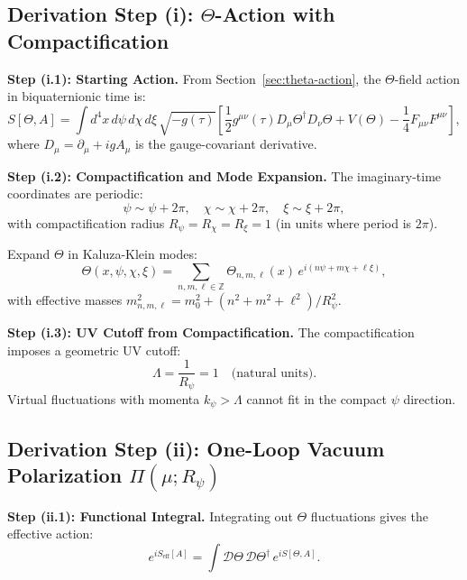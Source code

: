 \documentclass[11pt,a4paper]{article}
\theoremstyle{remark}
\begin{document}
\subsection{Derivation Step (i): $\Theta$-Action with Compactification}

\textbf{Step (i.1): Starting Action.} From Section~\ref{sec:theta-action}, the $\Theta$-field action in biquaternionic time is:
\begin{equation}
S[\Theta, A] = \int d^4x \, d\psi \, d\chi \, d\xi \, \sqrt{-g(\tau)} \left[ \frac{1}{2} g^{\mu\nu}(\tau) D_\mu \Theta^\dagger D_\nu \Theta + V(\Theta) - \frac{1}{4} F_{\mu\nu} F^{\mu\nu} \right],
\label{eq:action-step-i1}
\end{equation}
where $D_\mu = \partial_\mu + ig A_\mu$ is the gauge-covariant derivative.

\textbf{Step (i.2): Compactification and Mode Expansion.} The imaginary-time coordinates are periodic:
\begin{equation}
\psi \sim \psi + 2\pi, \quad \chi \sim \chi + 2\pi, \quad \xi \sim \xi + 2\pi,
\label{eq:periodicity-step}
\end{equation}
with compactification radius $R_\psi = R_\chi = R_\xi = 1$ (in units where period is $2\pi$).

Expand $\Theta$ in Kaluza-Klein modes:
\begin{equation}
\Theta(x, \psi, \chi, \xi) = \sum_{n,m,\ell \in \mathbb{Z}} \Theta_{n,m,\ell}(x) \, e^{i(n\psi + m\chi + \ell\xi)},
\label{eq:KK-expansion}
\end{equation}
with effective masses $m_{n,m,\ell}^2 = m_0^2 + (n^2 + m^2 + \ell^2)/R_\psi^2$.

\textbf{Step (i.3): UV Cutoff from Compactification.} The compactification imposes a geometric UV cutoff:
\begin{equation}
\Lambda = \frac{1}{R_\psi} = 1 \quad \text{(natural units)}.
\label{eq:Lambda-geometric}
\end{equation}
Virtual fluctuations with momenta $k_\psi > \Lambda$ cannot fit in the compact $\psi$ direction.

\subsection{Derivation Step (ii): One-Loop Vacuum Polarization $\Pi(\mu; R_\psi)$}

\textbf{Step (ii.1): Functional Integral.} Integrating out $\Theta$ fluctuations gives the effective action:
\begin{equation}
e^{iS_{\text{eff}}[A]} = \int \mathcal{D}\Theta \, \mathcal{D}\Theta^\dagger \, e^{iS[\Theta, A]}.
\label{eq:functional-integral-step}
\end{equation}
\end{document}
